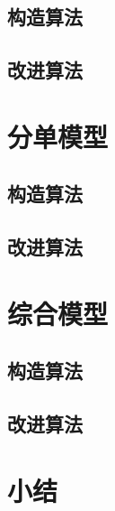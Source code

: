 \subsection{构造算法}

\subsection{改进算法}
\section{分单模型}
\subsection{构造算法}

\subsection{改进算法}
\section{综合模型}
\subsection{构造算法}

\subsection{改进算法}

\section{小结}
